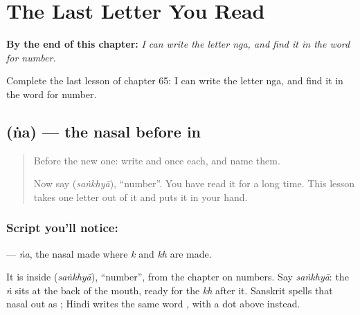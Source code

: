 
\chapter{The Last Letter You Read}
\label{ch:sa-last-letter-read}

\begin{chapteropening}
\textbf{By the end of this chapter:} \emph{I can write the letter nga, and find it in the word for number.}

Complete the last lesson of chapter 65: I can write the letter nga, and find it in the word for number.
\end{chapteropening}

\section[\texorpdfstring{\sk{ङ} (ṅa)}{ङ (ṅa)}]{ (ṅa) — the nasal before  in }

\label{lesson:SA-W65-letter-nga}



\begin{quote}
Before the new one: write  and  once each, and name them.

Now say \textbf{} (\emph{saṅkhyā}), \textquotedblleft{}number\textquotedblright{}. You have read it for a long time. This lesson takes one letter out of it and puts it in your hand.
\end{quote}

\subsection*{Script you'll notice: }
\textbf{} — \emph{ṅa}, the nasal made where \emph{k} and \emph{kh} are made.

It is inside \textbf{} (\emph{saṅkhyā}), \textquotedblleft{}number\textquotedblright{}, from the chapter on numbers. Say \emph{saṅkhyā}: the \emph{ṅ} sits at the back of the mouth, ready for the \emph{kh} after it. Sanskrit spells that nasal out as \textbf{}; Hindi writes the same word \textbf{}, with a dot above instead.

